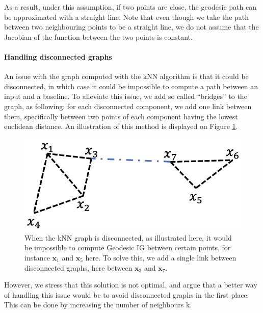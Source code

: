 As a result, under this assumption, if two points are close, the geodesic path can be approximated with a straight line. Note that even though we take the path between two neighbouring points to be a straight line, we do not assume that the Jacobian of the function between the two points is constant. 

\paragraph{Handling disconnected graphs}

An issue with the graph computed with the kNN algorithm is that it could be disconnected, in which case it could be impossible to compute a path between an input and a baseline. To alleviate this issue, we add so called ``bridges'' to the graph, as following: for each disconnected component, we add one link between them, specifically between two points of each component having the lowest euclidean distance. An illustration of this method is displayed on Figure \ref{fig:bridge}.

\begin{figure}[ht]
\vskip 0.2in
\begin{center}
\centerline{\includegraphics[width=0.8\columnwidth]{figures/bridge.png}}
\caption{When the kNN graph is disconnected, as illustrated here, it would be impossible to compute Geodesic IG between certain points, for instance $\textbf{x}_1$ and $\textbf{x}_5$ here. To solve this, we add a single link between disconnected graphs, here between $\textbf{x}_3$ and $\textbf{x}_7$.}
\label{fig:bridge}
\end{center}
\vskip -0.2in
\end{figure}

However, we stress that this solution is not optimal, and argue that a better way of handling this issue would be to avoid disconnected graphs in the first place. This can be done by increasing the number of neighbours k.

